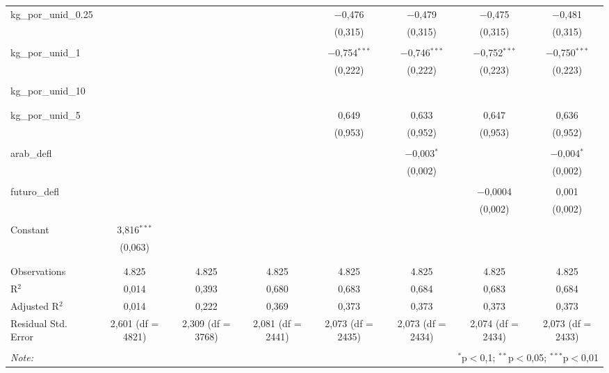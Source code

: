 \begin{table}[!htbp]
\begin{tabular}{@{\extracolsep{5pt}}lccccccc}
 kg\_por\_unid\_0.25 &  &  &  & $-$0,476 & $-$0,479 & $-$0,475 & $-$0,481 \\ 
  &  &  &  & (0,315) & (0,315) & (0,315) & (0,315) \\ 
  & & & & & & & \\ 
 kg\_por\_unid\_1 &  &  &  & $-$0,754$^{***}$ & $-$0,746$^{***}$ & $-$0,752$^{***}$ & $-$0,750$^{***}$ \\ 
  &  &  &  & (0,222) & (0,222) & (0,223) & (0,223) \\ 
  & & & & & & & \\ 
 kg\_por\_unid\_10 &  &  &  &  &  &  &  \\ 
  &  &  &  &  &  &  &  \\ 
  & & & & & & & \\ 
 kg\_por\_unid\_5 &  &  &  & 0,649 & 0,633 & 0,647 & 0,636 \\ 
  &  &  &  & (0,953) & (0,952) & (0,953) & (0,952) \\ 
  & & & & & & & \\ 
 arab\_defl &  &  &  &  & $-$0,003$^{*}$ &  & $-$0,004$^{*}$ \\ 
  &  &  &  &  & (0,002) &  & (0,002) \\ 
  & & & & & & & \\ 
 futuro\_defl &  &  &  &  &  & $-$0,0004 & 0,001 \\ 
  &  &  &  &  &  & (0,002) & (0,002) \\ 
  & & & & & & & \\ 
 Constant & 3,816$^{***}$ &  &  &  &  &  &  \\ 
  & (0,063) &  &  &  &  &  &  \\ 
  & & & & & & & \\ 
\hline \\[-1.8ex] 
Observations & 4.825 & 4.825 & 4.825 & 4.825 & 4.825 & 4.825 & 4.825 \\ 
R$^{2}$ & 0,014 & 0,393 & 0,680 & 0,683 & 0,684 & 0,683 & 0,684 \\ 
Adjusted R$^{2}$ & 0,014 & 0,222 & 0,369 & 0,373 & 0,373 & 0,373 & 0,373 \\ 
Residual Std. Error & 2,601 (df = 4821) & 2,309 (df = 3768) & 2,081 (df = 2441) & 2,073 (df = 2435) & 2,073 (df = 2434) & 2,074 (df = 2434) & 2,073 (df = 2433) \\ 
\hline 
\hline \\[-1.8ex] 
\textit{Note:}  & \multicolumn{7}{r}{$^{*}$p$<$0,1; $^{**}$p$<$0,05; $^{***}$p$<$0,01} \\ 
\end{tabular} 
\end{table} 
